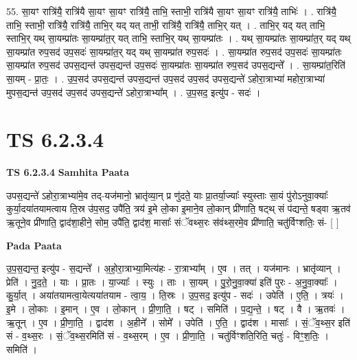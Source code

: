 \documentclass[17pt]{extarticle}
\begin{document}
55. सा॒यꣳ रात्रि॑यै॒ रात्रि॑यै सा॒यꣳ सा॒यꣳ रात्रि॑यै॒ ताभि॒ स्ताभी॒ रात्रि॑यै सा॒यꣳ सा॒यꣳ रात्रि॑यै॒ ताभिः॑ । . रात्रि॑यै॒ ताभि॒ स्ताभी॒ रात्रि॑यै॒ रात्रि॑यै॒ ताभि॒र् यद् यत् ताभी॒ रात्रि॑यै॒ रात्रि॑यै॒ ताभि॒र् यत् । . ताभि॒र् यद् यत् ताभि॒ स्ताभि॒र् यथ् सा॒यम्प्रा॑तः सा॒यम्प्रा॑त॒र् यत् ताभि॒ स्ताभि॒र् यथ् सा॒यम्प्रा॑तः । . यथ् सा॒यम्प्रा॑तः सा॒यम्प्रा॑त॒र् यद् यथ् सा॒यम्प्रा॑त रुप॒सद॑ उप॒सदः॑ सा॒यम्प्रा॑त॒र् यद् यथ् सा॒यम्प्रा॑त रुप॒सदः॑ । . सा॒यम्प्रा॑त रुप॒सद॑ उप॒सदः॑ सा॒यम्प्रा॑तः सा॒यम्प्रा॑त रुप॒सद॑ उपस॒द्यन्त॑ उपस॒द्यन्त॑ उप॒सदः॑ सा॒यम्प्रा॑तः सा॒यम्प्रा॑त रुप॒सद॑ उपस॒द्यन्ते᳚ । . सा॒यम्प्रा॑त॒रिति॑ सा॒यम् - प्रा॒तः॒ । . उ॒प॒सद॑ उपस॒द्यन्त॑ उपस॒द्यन्त॑ उप॒सद॑ उप॒सद॑ उपस॒द्यन्ते॑ ऽहोरा॒त्राभ्या॑ महोरा॒त्राभ्या॑ मुपस॒द्यन्त॑ उप॒सद॑ उप॒सद॑ उपस॒द्यन्ते॑ ऽहोरा॒त्राभ्या᳚म् । . उ॒प॒सद॒ इत्यु॑प - सदः॑ । \newline
\pagebreak
{}

\section{ TS 6.2.3.4 }

\textbf{TS 6.2.3.4 } \newline
\textbf{Samhita Paata} \newline

उपस॒द्यन्ते॑ ऽहोरा॒त्राभ्या॑मे॒व तद्-यज॑मानो॒ भ्रातृ॑व्या॒न् प्र णु॑दते॒ याः प्रा॒तर्या॒ज्याः᳚ स्युस्ताः सा॒यं पु॑रोऽनुवा॒क्याः᳚ कुर्या॒दया॑तयामत्वाय ति॒स्र उ॑प॒सद॒ उपै॑ति॒ त्रय॑ इ॒मे लो॒का इ॒माने॒व लो॒कान् प्री॑णाति॒ षट्थ् सं प॑द्यन्ते॒ षड्वा ऋ॒तव॑ ऋ॒तूने॒व प्री॑णाति॒ द्वाद॑शा॒हीने॒ सोम॒ उपै॑ति॒ द्वाद॑श॒ मासाः᳚ संॅवथ्स॒रः स॑वंथ्स॒रमे॒व प्री॑णाति॒ चतु॑र्विꣳशतिः॒ सं- [  ] \newline

\textbf{Pada Paata} \newline

उ॒प॒स॒द्यन्त॒ इत्यु॑प - स॒द्यन्ते᳚ । अ॒हो॒रा॒त्राभ्या॒मित्य॑हः - रा॒त्राभ्या᳚म् । ए॒व । तत् । यज॑मानः । भ्रातृ॑व्यान् । प्रेति॑ । नु॒द॒ते॒ । याः । प्रा॒तः । या॒ज्याः᳚ । स्युः । ताः । सा॒यम् । पु॒रो॒नु॒वा॒क्या॑ इति॑ पुरः - अ॒नु॒वा॒क्याः᳚ । कु॒र्या॒त् । अया॑तयामत्वा॒येत्यया॑तयाम - त्वा॒य॒ । ति॒स्रः । उ॒प॒सद॒ इत्यु॑प - सदः॑ । उपेति॑ । ए॒ति॒ । त्रयः॑ । इ॒मे । लो॒काः । इ॒मान् । ए॒व । लो॒कान् । प्री॒णा॒ति॒ । षट् । समिति॑ । प॒द्य॒न्ते॒ । षट् । वै । ऋ॒तवः॑ । ऋ॒तून् । ए॒व । प्री॒णा॒ति॒ । द्वाद॑श । अ॒हीने᳚ । सोमे᳚ । उपेति॑ । ए॒ति॒ । द्वाद॑श । मासाः᳚ । सं॒ॅव॒थ्स॒र इति॑ सं - व॒थ्स॒रः । सं॒ॅव॒थ्स॒रमिति॑ सं - व॒थ्स॒रम् । ए॒व । प्री॒णा॒ति॒ । चतु॑र्विꣳशति॒रिति॒ चतुः॑ - विꣳ॒॒श॒तिः॒ । समिति॑ ।  \newline
\end{document}
